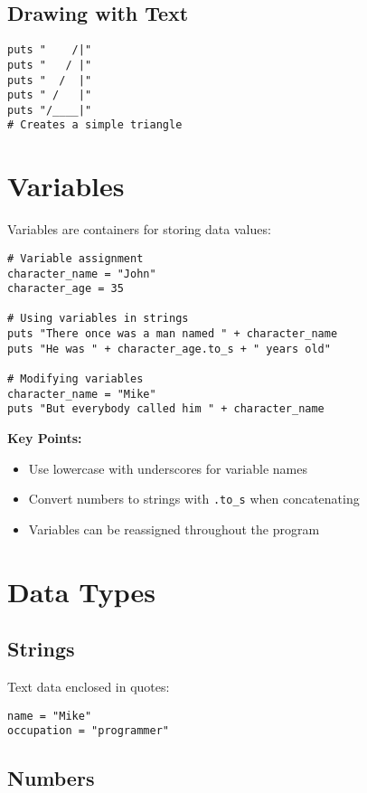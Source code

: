 \documentclass[12pt,a4paper]{article}
\begin{document}
\subsection{Drawing with Text}

\begin{lstlisting}
puts "    /|"
puts "   / |"
puts "  /  |"
puts " /   |"
puts "/____|"
# Creates a simple triangle
\end{lstlisting}

\section{Variables}

Variables are containers for storing data values:

\begin{lstlisting}
# Variable assignment
character_name = "John"
character_age = 35

# Using variables in strings
puts "There once was a man named " + character_name
puts "He was " + character_age.to_s + " years old"

# Modifying variables
character_name = "Mike"
puts "But everybody called him " + character_name
\end{lstlisting}

\textbf{Key Points:}
\begin{itemize}
    \item Use lowercase with underscores for variable names
    \item Convert numbers to strings with \texttt{.to\_s} when concatenating
    \item Variables can be reassigned throughout the program
\end{itemize}

\section{Data Types}

\subsection{Strings}
Text data enclosed in quotes:
\begin{lstlisting}
name = "Mike"
occupation = "programmer"
\end{lstlisting}

\subsection{Numbers}
\end{document}
